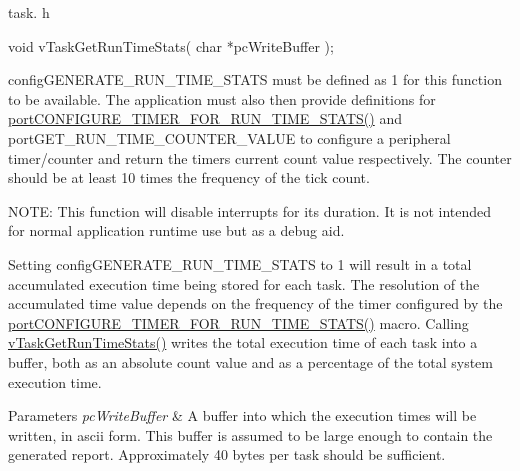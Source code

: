 task. h 
\begin{DoxyPre}void vTaskGetRunTimeStats( char *pcWriteBuffer );\end{DoxyPre}


config\-G\-E\-N\-E\-R\-A\-T\-E\-\_\-\-R\-U\-N\-\_\-\-T\-I\-M\-E\-\_\-\-S\-T\-A\-T\-S must be defined as 1 for this function to be available. The application must also then provide definitions for \hyperlink{_free_r_t_o_s_8h_a727939bcdb98501e0eba0ec8a1841e1b}{port\-C\-O\-N\-F\-I\-G\-U\-R\-E\-\_\-\-T\-I\-M\-E\-R\-\_\-\-F\-O\-R\-\_\-\-R\-U\-N\-\_\-\-T\-I\-M\-E\-\_\-\-S\-T\-A\-T\-S()} and port\-G\-E\-T\-\_\-\-R\-U\-N\-\_\-\-T\-I\-M\-E\-\_\-\-C\-O\-U\-N\-T\-E\-R\-\_\-\-V\-A\-L\-U\-E to configure a peripheral timer/counter and return the timers current count value respectively. The counter should be at least 10 times the frequency of the tick count.

N\-O\-T\-E\-: This function will disable interrupts for its duration. It is not intended for normal application runtime use but as a debug aid.

Setting config\-G\-E\-N\-E\-R\-A\-T\-E\-\_\-\-R\-U\-N\-\_\-\-T\-I\-M\-E\-\_\-\-S\-T\-A\-T\-S to 1 will result in a total accumulated execution time being stored for each task. The resolution of the accumulated time value depends on the frequency of the timer configured by the \hyperlink{_free_r_t_o_s_8h_a727939bcdb98501e0eba0ec8a1841e1b}{port\-C\-O\-N\-F\-I\-G\-U\-R\-E\-\_\-\-T\-I\-M\-E\-R\-\_\-\-F\-O\-R\-\_\-\-R\-U\-N\-\_\-\-T\-I\-M\-E\-\_\-\-S\-T\-A\-T\-S()} macro. Calling \hyperlink{task_8h_ac34910d5eac69f0538ee218e527663a7}{v\-Task\-Get\-Run\-Time\-Stats()} writes the total execution time of each task into a buffer, both as an absolute count value and as a percentage of the total system execution time.


\begin{DoxyParams}{Parameters}
{\em pc\-Write\-Buffer} & A buffer into which the execution times will be written, in ascii form. This buffer is assumed to be large enough to contain the generated report. Approximately 40 bytes per task should be sufficient. \\
\hline
\end{DoxyParams}
